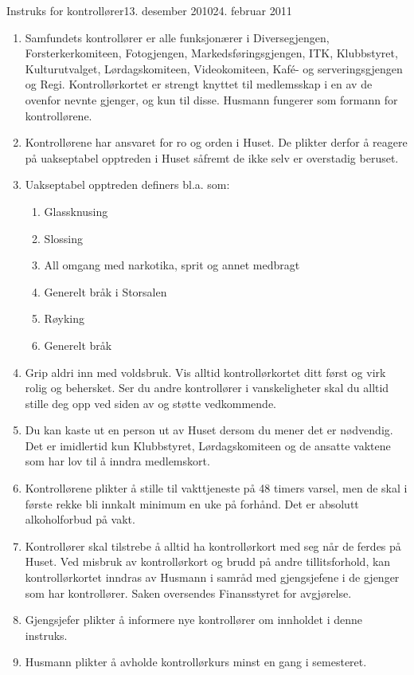 \begin{instruks}{Instruks for kontrollører}{13. desember 2010}{24. februar 2011}

    \begin{enumerate}
        \item Samfundets kontrollører er alle funksjonærer i Diversegjengen,
            Forsterkerkomiteen, Fotogjengen, Markedsføringsgjengen, ITK, 
Klubbstyret, Kulturutvalget, Lørdagskomiteen,
            Videokomiteen,
            Kaf\'e- og serveringsgjengen og Regi. Kontrollørkortet er 
strengt knyttet til medlemsskap
            i en av de ovenfor nevnte gjenger,
            og kun til disse. Husmann fungerer som formann for kontrollørene.
        \item Kontrollørene har ansvaret for ro og orden i Huset. De plikter derfor å
            reagere på uakseptabel opptreden i
            Huset såfremt de ikke selv er overstadig beruset.
        \item Uakseptabel opptreden definers bl.a. som:
            \begin{enumerate}
                \item  Glassknusing
                \item  Slossing
                \item  All omgang med narkotika, sprit og annet medbragt
                \item  Generelt bråk i Storsalen
                \item  Røyking
                \item  Generelt bråk
            \end{enumerate}
        \item Grip aldri inn med voldsbruk. Vis alltid kontrollørkortet ditt først og virk
            rolig og behersket. Ser du andre
            kontrollører i vanskeligheter skal du alltid stille deg opp ved siden av og
            støtte vedkommende.
        \item Du kan kaste ut en person ut av Huset dersom du mener det er nødvendig. Det
            er imidlertid kun Klubbstyret,
            Lørdagskomiteen og de ansatte vaktene som har lov til å inndra medlemskort.
        \item Kontrollørene plikter å stille til vakttjeneste på 48 timers varsel, men de
            skal i første rekke bli innkalt
            minimum en uke på forhånd. Det er absolutt alkoholforbud på vakt.
        \item  Kontrollører skal tilstrebe å alltid ha kontrollørkort med seg når de
            ferdes på Huset. Ved misbruk av
            kontrollørkort og brudd på andre tillitsforhold, kan kontrollørkortet inndras
            av Husmann i samråd med
            gjengsjefene i de gjenger som har kontrollører. Saken oversendes Finansstyret
            for avgjørelse.
        \item Gjengsjefer plikter å informere nye kontrollører om innholdet i denne
            instruks.
        \item Husmann plikter å avholde kontrollørkurs minst en gang i semesteret.
    \end{enumerate}

\end{instruks}


